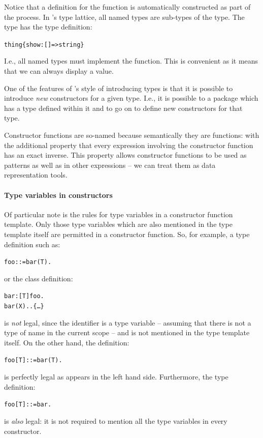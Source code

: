 Notice that a definition for the function  is automatically constructed as part of the process. In \go's type lattice, all named types are sub-types of the  type. The  type has the type definition:
\begin{alltt}
thing \typearrow \{ show:[]=>string \}
\end{alltt}
I.e., all named types must implement the  function. This is convenient as it means that we can always display a \go value. 

\begin{aside}
One of the features of \go's style of introducing types is that it is possible to introduce \emph{new} constructors for a given type. I.e., it is possible to  a package which has a type defined within it and to go on to define new constructors for that type.
\end{aside}

Constructor functions are so-named because semantically they are functions: with the additional property that every expression involving the constructor function has an exact inverse. This property allows constructor functions to be used as patterns as well as in other expressions -- we can treat them as data representation tools.

\paragraph{Type variables in constructors}
Of particular note is the rules for type variables in a constructor function template. Only those type variables which are also mentioned in the type template itself are permitted in a constructor function. So, for example, a type definition such as:
\begin{alltt}
foo ::= bar(T).
\end{alltt}
or the class definition:
\begin{alltt}
bar:[T]\conarrow{}foo.
bar(X)..\{ \ldots \}
\end{alltt}
is \emph{not} legal, since the identifier  is a type variable -- assuming that there is not a type of name  in the current scope -- and  is not mentioned in the type template  itself. On the other hand, the definition:
\begin{alltt}
foo[T] ::= bar(T).
\end{alltt}
is perfectly legal as  appears in the left hand side. Furthermore, the type definition:
\begin{alltt}
foo[T] ::= bar.
\end{alltt}
is \emph{also} legal: it is not required to mention all the type variables in every constructor.

